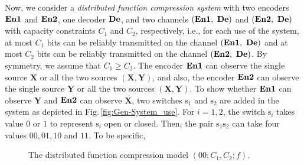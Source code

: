 \documentclass[11pt,draftclsnofoot,onecolumn]{IEEEtran}
\newcommand{\Enone}{\bf{En1}}
\newcommand{\Entwo}{\bf{En2}}
\newcommand{\De}{\bf{De}}
\begin{document}
 Now, we consider a  \emph{distributed function compression system} with two encoders $\Enone$ and $\Entwo$, one decoder $\De$,  and two channels $(\Enone,~\De)$ and $(\Entwo,~\De)$  with capacity constraints $C_1$ and $C_2$, respectively, i.e., for each use of the system, at most $C_1$ bits can be reliably transmitted on the channel $(\text{$\Enone$},~\text{$\De$})$ and at most $C_2$ bits can be reliably transmitted on the channel $(\text{$\Entwo$},~\text{$\De$})$.
  By symmetry, we  assume  that $C_1\geq C_2$.
  The encoder  $\Enone$ can observe the single source $\boldsymbol{X}$ or all the two sources $(\boldsymbol{X},\boldsymbol{Y})$, and also, the encoder  $\Entwo$ can observe the single source $\boldsymbol{Y}$ or all the two sources $(\boldsymbol{X},\boldsymbol{Y})$.
 To show whether $\Enone$ can observe $\boldsymbol{Y}$ and $\Entwo$ can observe $\boldsymbol{X}$, two switches  $\boldsymbol{\mathrm{s}}_1$ and $\boldsymbol{\mathrm{s}}_2$ are added in the system as depicted in Fig.\,\ref{fig:Gen-System_use}. For $i=1,2$,  the switch $\boldsymbol{\mathrm{s}}_i$ takes value $0$ or $1$ to represent  $\boldsymbol{\mathrm{s}}_i$ open or closed. Then, the pair $\boldsymbol{\mathrm{s}}_1\boldsymbol{\mathrm{s}}_2$ can take four values $00,01,10$ and $11$. To be specific,

\begin{figure}[t]
 \centering
  {
}
\caption{The distributed function compression model $(00;C_1,C_2;f)$.}\label{fig:System_use-00}
\end{figure}
\end{document}
